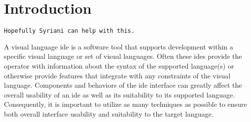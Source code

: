 \section{Introduction} \label{sec:introduction}

\begin{verbatim}
Hopefully Syriani can help with this.
\end{verbatim}

A visual language \ac{ide} is a software tool that supports
development within a specific visual language or set of visual languages.
Often these \acp{ide} provide the operator with information about the
syntax of the supported language(s) or otherwise provide features that
integrate with any constraints of the visual language. Components and
behaviors of the \ac{ide} interface can greatly affect the overall
usability of an \ac{ide} as well as its suitability to its supported
language. Consequently, it is important to utilize as many techniques as
possible to ensure both overall interface usability and suitability to the
target language.
